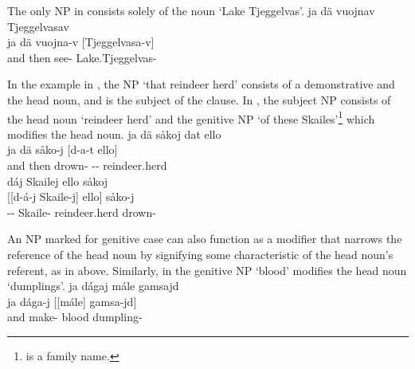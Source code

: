 The only NP in  consists solely of the noun  ‘Lake Tjeggelvas’. 
\ea\label{NPstructureEx0}%
\glll	ja dä vuojnav Tjeggelvasav\\
	ja dä vuojna-v [Tjeggelvasa-v]\subNP\\
	and then see- Lake.Tjeggelvas-\\\nopagebreak
{}	
\z

In the example in , the NP  ‘that reindeer herd’ consists of a demonstrative and the head noun, and is the subject of the clause. 
In , the subject NP consists of the head noun  ‘reindeer herd’ and the genitive NP  ‘of these Skailes’\footnote{ is a family name.} 
which modifies the head noun. 
\ea\label{NPstructureEx1}%
\glll	ja dä såkoj dat ello\\
	ja dä såko-j [d-a-t ello]\subNP \\
	and then drown- -- reindeer.herd\BS{}\\\nopagebreak
{}	
\z
\ea\label{NPstructureEx2}%
\glll	dáj Skailej ello såkoj\\
	[[d-á-j {Skaile-j]\subNP{}}	{ello]\subNP{}} såko-j\\
	-- Skaile- reindeer.herd\BS{} drown-\\\nopagebreak
{}	
\z

An NP marked for genitive case can also function as a modifier that narrows the reference of the head noun by signifying some characteristic of the head noun’s referent, as in  above. Similarly, in  the genitive NP  ‘blood’ modifies the head noun  ‘dumplings’. 
\ea\label{NPstructureGenNPex1}%
\glll	ja dágaj mále gamsajd\\
	ja dága-j {[[mále]\subNP{}} {gamsa-jd]\subNP{}} \\
	and make- blood\BS{} dumpling-\\\nopagebreak
{}	
\z

